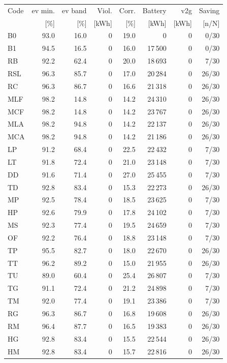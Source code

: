 \noindent\begin{minipage}{\textwidth}\singlespacing\captionsetup{font=footnotesize}
\setlength{\tabcolsep}{4pt}
\renewcommand{\arraystretch}{1.0}
\label{tab:full-scorecard-4-1}
\fontsize{8}{9}\selectfont
\begin{tabular*}{\textwidth}{@{\extracolsep{\fill}}lrrrrrrr@{}}
\toprule
Code & \gls{ev} min. & \gls{ev} band & Viol. & Corr. & Battery & \gls{v2g} & Saving\\
 & [\%] & [\%] & [kWh] & [\%] & [kWh] & [kWh] & [n/N]\\
\midrule
B0 & 93.0 & 16.0 & 0 & 19.0 & 0 & 0 & 0/30\\
B1 & 94.5 & 16.5 & 0 & 16.0 & 17\,500 & 0 & 0/30\\
RB & 92.2 & 62.4 & 0 & 20.0 & 18\,693 & 0 & 7/30\\
RSL & 96.3 & 85.7 & 0 & 17.0 & 20\,284 & 0 & 26/30\\
RC & 96.3 & 86.7 & 0 & 16.6 & 21\,318 & 0 & 26/30\\
MLF & 98.2 & 14.8 & 0 & 14.2 & 24\,310 & 0 & 26/30\\
MCF & 98.2 & 14.8 & 0 & 14.2 & 23\,767 & 0 & 26/30\\
MLA & 98.2 & 94.8 & 0 & 14.2 & 22\,137 & 0 & 26/30\\
MCA & 98.2 & 94.8 & 0 & 14.2 & 21\,186 & 0 & 26/30\\
LP & 91.2 & 68.4 & 0 & 22.5 & 22\,432 & 0 & 7/30\\
LT & 91.8 & 72.4 & 0 & 21.0 & 23\,148 & 0 & 7/30\\
DD & 91.6 & 71.4 & 0 & 27.0 & 25\,455 & 0 & 7/30\\
TD & 92.8 & 83.4 & 0 & 15.3 & 22\,273 & 0 & 26/30\\
MP & 92.5 & 78.4 & 0 & 18.5 & 23\,625 & 0 & 7/30\\
HP & 92.6 & 79.9 & 0 & 17.8 & 24\,102 & 0 & 7/30\\
MS & 92.3 & 77.4 & 0 & 19.5 & 24\,659 & 0 & 7/30\\
OF & 92.2 & 76.4 & 0 & 18.8 & 23\,148 & 0 & 7/30\\
TP & 95.5 & 82.7 & 0 & 18.0 & 22\,670 & 0 & 26/30\\
TT & 96.2 & 89.2 & 0 & 15.0 & 21\,955 & 0 & 26/30\\
TU & 89.0 & 60.4 & 0 & 25.4 & 26\,807 & 0 & 7/30\\
TG & 91.1 & 72.4 & 0 & 21.2 & 24\,898 & 0 & 7/30\\
TM & 92.0 & 77.4 & 0 & 19.1 & 23\,386 & 0 & 7/30\\
RG & 96.3 & 86.7 & 0 & 16.8 & 19\,608 & 0 & 26/30\\
RM & 96.4 & 87.7 & 0 & 16.5 & 19\,383 & 0 & 26/30\\
HG & 92.8 & 83.4 & 0 & 15.5 & 22\,544 & 0 & 26/30\\
HM & 92.8 & 83.4 & 0 & 15.7 & 22\,816 & 0 & 26/30\\
\bottomrule\end{tabular*}
\end{minipage}\par\medskip
